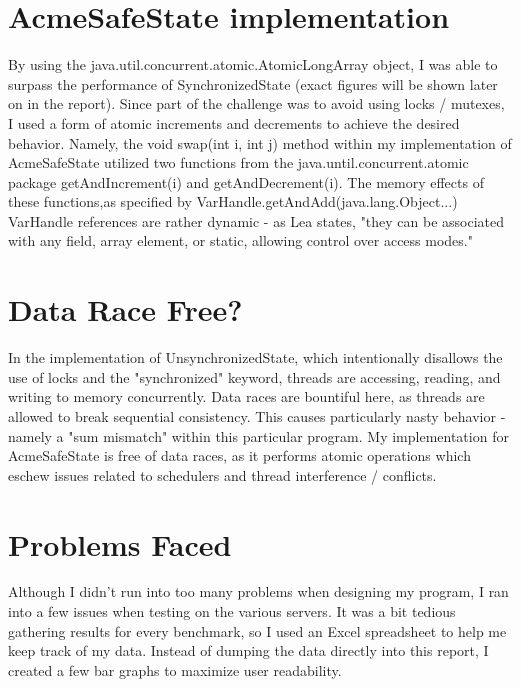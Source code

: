\section{AcmeSafeState implementation}
By using the java.util.concurrent.atomic.AtomicLongArray object, I was able to surpass the performance of SynchronizedState (exact figures will be shown later on in the report). Since part of the challenge was to avoid using locks / mutexes, I used a form of atomic increments and decrements to achieve the desired behavior. Namely, the 
void swap(int i, int j) method within my implementation of AcmeSafeState utilized two functions from the java.until.concurrent.atomic package getAndIncrement(i) and getAndDecrement(i). The memory effects of these functions,as specified by  VarHandle.getAndAdd(java.lang.Object...) VarHandle references are rather dynamic - as Lea states, "they can be associated with any field, array element, or static, allowing control over access modes." 

\section{Data Race Free?}

In the implementation of UnsynchronizedState, which intentionally disallows the use of locks and the "synchronized" keyword, threads are accessing, reading, and writing to memory concurrently. Data races are bountiful here, as threads are allowed to break sequential consistency. This causes particularly nasty behavior - namely a "sum mismatch" within this particular program. My implementation for AcmeSafeState is free of data races, as it performs atomic operations which eschew issues related to schedulers and thread interference / conflicts. 


\section{Problems Faced}

Although I didn't run into too many problems when designing my program, I ran into
a few issues when testing on the various servers. It was a bit tedious gathering results for every benchmark, so I used an Excel spreadsheet to help me keep track of my data. Instead of dumping the data directly into this report, I created a few bar graphs to maximize user readability.

